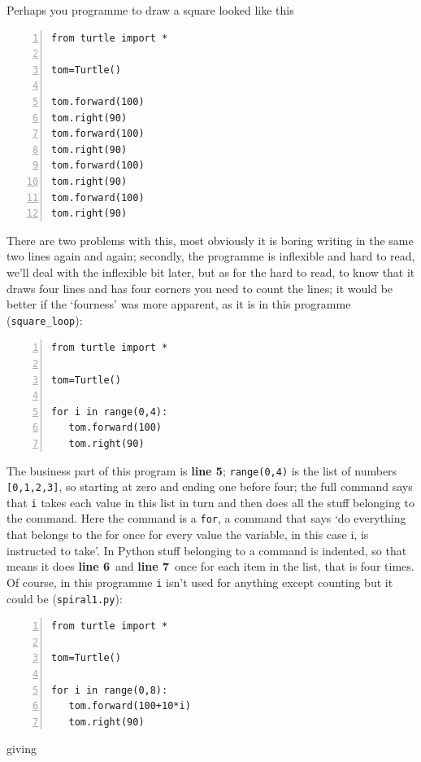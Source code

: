 \documentclass[11pt,a4paper]{scrartcl}
\newcommand{\lnn}[1]{\textbf{line #1}\,}
\begin{document}
Perhaps you programme to draw a square looked like this
\begin{lstlisting}[numbers=left]
from turtle import *

tom=Turtle()

tom.forward(100)
tom.right(90)
tom.forward(100)
tom.right(90)
tom.forward(100)
tom.right(90)
tom.forward(100)
tom.right(90)
\end{lstlisting}
There are two problems with this, most obviously it is boring writing
in the same two lines again and again; secondly, the programme is
inflexible and hard to read, we'll deal with the inflexible bit later,
but as for the hard to read, to know that it draws four lines and has
four corners you need to count the lines; it would be better if the
\lq{}fourness\rq{} was more apparent, as it is in this programme (\texttt{square\_loop}):
\begin{lstlisting}[numbers=left]
from turtle import *

tom=Turtle()

for i in range(0,4):
   tom.forward(100)
   tom.right(90)

\end{lstlisting}
The business part of this program is \textbf{line 5};
\texttt{range(0,4)} is the list of numbers \texttt{[0,1,2,3]}, so
starting at zero and ending one before four; the full command says
that \texttt{i} takes each value in this list in turn and then does
all the stuff belonging to the command. Here the command is a
\texttt{for}, a command that says \lq{}do everything that belongs to
the for once for every value the variable, in this case i, is
instructed to take\rq{}. In Python stuff belonging to a command is
indented, so that means it does \lnn{6} and \lnn{7} once for each item
in the list, that is four times. Of course, in this programme
\texttt{i} isn't used for anything except counting but it could be
(\texttt{spiral1.py}):
\begin{lstlisting}[numbers=left]
from turtle import *

tom=Turtle()

for i in range(0,8):
   tom.forward(100+10*i)
   tom.right(90)

\end{lstlisting}
giving
\end{document}
